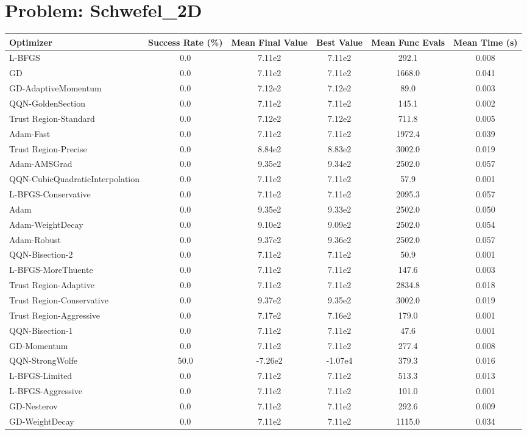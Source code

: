 \documentclass{article}
\begin{document}
\section{Problem: Schwefel\_2D}
\begin{longtable}{p{3cm}*{5}{c}}
\toprule
\textbf{Optimizer} & \textbf{Success Rate (\%)} & \textbf{Mean Final Value} & \textbf{Best Value} & \textbf{Mean Func Evals} & \textbf{Mean Time (s)} \\
\midrule
L-BFGS & 0.0 & 7.11e2 & 7.11e2 & 292.1 & 0.008 \\
GD & 0.0 & 7.11e2 & 7.11e2 & 1668.0 & 0.041 \\
GD-AdaptiveMomentum & 0.0 & 7.12e2 & 7.12e2 & 89.0 & 0.003 \\
QQN-GoldenSection & 0.0 & 7.11e2 & 7.11e2 & 145.1 & 0.002 \\
Trust Region-Standard & 0.0 & 7.12e2 & 7.12e2 & 711.8 & 0.005 \\
Adam-Fast & 0.0 & 7.11e2 & 7.11e2 & 1972.4 & 0.039 \\
Trust Region-Precise & 0.0 & 8.84e2 & 8.83e2 & 3002.0 & 0.019 \\
Adam-AMSGrad & 0.0 & 9.35e2 & 9.34e2 & 2502.0 & 0.057 \\
QQN-CubicQuadraticInterpolation & 0.0 & 7.11e2 & 7.11e2 & 57.9 & 0.001 \\
L-BFGS-Conservative & 0.0 & 7.11e2 & 7.11e2 & 2095.3 & 0.057 \\
Adam & 0.0 & 9.35e2 & 9.33e2 & 2502.0 & 0.050 \\
Adam-WeightDecay & 0.0 & 9.10e2 & 9.09e2 & 2502.0 & 0.054 \\
Adam-Robust & 0.0 & 9.37e2 & 9.36e2 & 2502.0 & 0.057 \\
QQN-Bisection-2 & 0.0 & 7.11e2 & 7.11e2 & 50.9 & 0.001 \\
L-BFGS-MoreThuente & 0.0 & 7.11e2 & 7.11e2 & 147.6 & 0.003 \\
Trust Region-Adaptive & 0.0 & 7.11e2 & 7.11e2 & 2834.8 & 0.018 \\
Trust Region-Conservative & 0.0 & 9.37e2 & 9.35e2 & 3002.0 & 0.019 \\
Trust Region-Aggressive & 0.0 & 7.17e2 & 7.16e2 & 179.0 & 0.001 \\
QQN-Bisection-1 & 0.0 & 7.11e2 & 7.11e2 & 47.6 & 0.001 \\
GD-Momentum & 0.0 & 7.11e2 & 7.11e2 & 277.4 & 0.008 \\
QQN-StrongWolfe & 50.0 & -7.26e2 & -1.07e4 & 379.3 & 0.016 \\
L-BFGS-Limited & 0.0 & 7.11e2 & 7.11e2 & 513.3 & 0.013 \\
L-BFGS-Aggressive & 0.0 & 7.11e2 & 7.11e2 & 101.0 & 0.001 \\
GD-Nesterov & 0.0 & 7.11e2 & 7.11e2 & 292.6 & 0.009 \\
GD-WeightDecay & 0.0 & 7.11e2 & 7.11e2 & 1115.0 & 0.034 \\
\bottomrule
\end{longtable}
\end{document}
